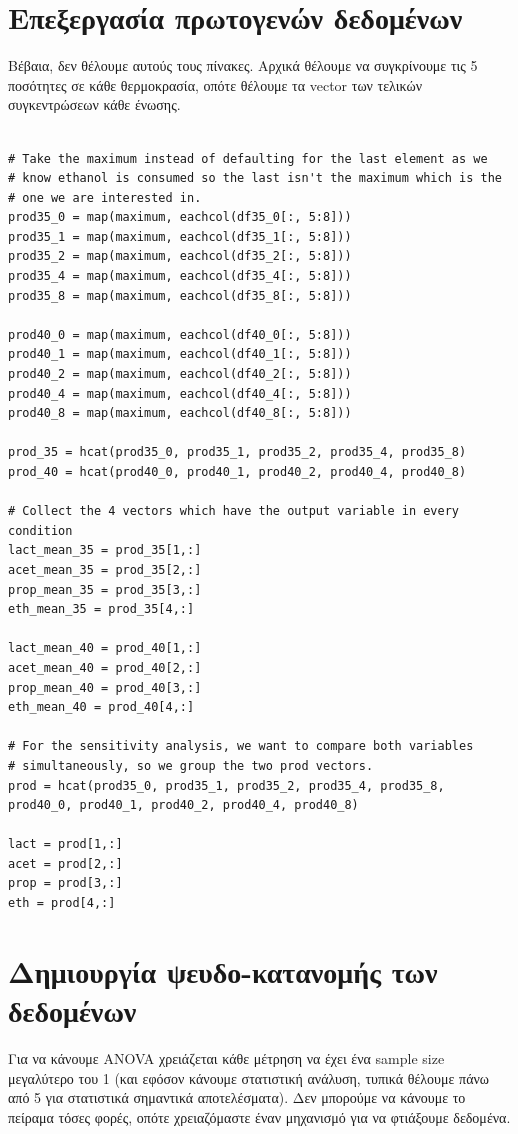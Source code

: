 \documentclass[11pt]{article}
\begin{document}
\section{Επεξεργασία πρωτογενών δεδομένων}
\label{sec:org52dc559}
Βέβαια, δεν θέλουμε αυτούς τους πίνακες. Αρχικά θέλουμε να συγκρίνουμε τις 5 ποσότητες σε κάθε θερμοκρασία, οπότε θέλουμε τα vector των τελικών συγκεντρώσεων κάθε ένωσης.

\begin{verbatim}

# Take the maximum instead of defaulting for the last element as we
# know ethanol is consumed so the last isn't the maximum which is the
# one we are interested in.
prod35_0 = map(maximum, eachcol(df35_0[:, 5:8]))
prod35_1 = map(maximum, eachcol(df35_1[:, 5:8]))
prod35_2 = map(maximum, eachcol(df35_2[:, 5:8]))
prod35_4 = map(maximum, eachcol(df35_4[:, 5:8]))
prod35_8 = map(maximum, eachcol(df35_8[:, 5:8]))

prod40_0 = map(maximum, eachcol(df40_0[:, 5:8]))
prod40_1 = map(maximum, eachcol(df40_1[:, 5:8]))
prod40_2 = map(maximum, eachcol(df40_2[:, 5:8]))
prod40_4 = map(maximum, eachcol(df40_4[:, 5:8]))
prod40_8 = map(maximum, eachcol(df40_8[:, 5:8]))

prod_35 = hcat(prod35_0, prod35_1, prod35_2, prod35_4, prod35_8)
prod_40 = hcat(prod40_0, prod40_1, prod40_2, prod40_4, prod40_8)

# Collect the 4 vectors which have the output variable in every condition
lact_mean_35 = prod_35[1,:]
acet_mean_35 = prod_35[2,:]
prop_mean_35 = prod_35[3,:]
eth_mean_35 = prod_35[4,:]

lact_mean_40 = prod_40[1,:]
acet_mean_40 = prod_40[2,:]
prop_mean_40 = prod_40[3,:]
eth_mean_40 = prod_40[4,:]

# For the sensitivity analysis, we want to compare both variables
# simultaneously, so we group the two prod vectors.
prod = hcat(prod35_0, prod35_1, prod35_2, prod35_4, prod35_8, prod40_0, prod40_1, prod40_2, prod40_4, prod40_8)

lact = prod[1,:]
acet = prod[2,:]
prop = prod[3,:]
eth = prod[4,:]
\end{verbatim}

\section{Δημιουργία ψευδο-κατανομής των δεδομένων}
\label{sec:org3e5fbdb}
Για να κάνουμε ANOVA χρειάζεται κάθε μέτρηση να έχει ένα sample size μεγαλύτερο του 1 (και εφόσον κάνουμε στατιστική ανάλυση, τυπικά θέλουμε πάνω από 5 για στατιστικά σημαντικά αποτελέσματα). Δεν μπορούμε να κάνουμε το πείραμα τόσες φορές, οπότε χρειαζόμαστε έναν μηχανισμό για να φτιάξουμε δεδομένα.
\end{document}
